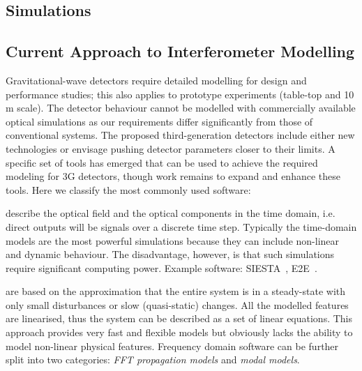\begin{samepage} %

\section{Simulations}
\subsection{Current Approach to Interferometer Modelling}
Gravitational-wave detectors require detailed modelling for design and performance studies; this also applies 
to prototype experiments (table-top and 10\,m scale). 
The detector behaviour cannot be modelled with commercially available optical simulations as our requirements differ significantly from those of conventional systems. 
The proposed third-generation detectors include either new technologies or envisage pushing detector parameters closer to their limits. 
A specific set of tools has emerged that can be used to achieve the required modeling for 3G detectors, though work remains to expand and enhance these tools. Here we classify the most commonly used software:

 describe the optical field and the optical components in the time domain, i.e. direct outputs will be signals over a discrete time step. Typically the time-domain models are the most powerful   simulations because they can include non-linear and dynamic behaviour.
The disadvantage, however, is that such simulations require significant computing power. Example software: SIESTA~\cite{SIESTA}, E2E~\cite{e2e_2000}.


 are based on the approximation that the entire system is in a steady-state with only small disturbances or slow (quasi-static) changes. All the modelled features are linearised, thus the system can be described as a set of linear equations. 
This approach provides very fast and flexible models but obviously lacks the ability to model non-linear physical features. Frequency domain software can be further split into two categories: \emph{FFT propagation models} and \emph{modal models}.

\end{samepage} %

